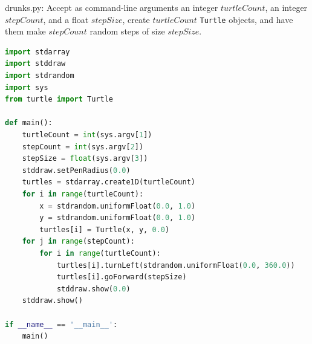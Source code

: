 \documentclass[8pt,a4paper,compress]{beamer}
\begin{document}
\begin{frame}[fragile]
\pause

\begin{framed}
\tiny drunks.py: Accept as command-line arguments an integer $turtleCount$, an integer $stepCount$, and a float $stepSize$, create $turtleCount$ \lstinline{Turtle} objects, and have them make $stepCount$ random steps of size $stepSize$.
\end{framed}

\begin{lstlisting}[language=python,style=focusin]
import stdarray
import stddraw
import stdrandom
import sys
from turtle import Turtle

def main():
    turtleCount = int(sys.argv[1])
    stepCount = int(sys.argv[2])
    stepSize = float(sys.argv[3])
    stddraw.setPenRadius(0.0)
    turtles = stdarray.create1D(turtleCount)
    for i in range(turtleCount):
        x = stdrandom.uniformFloat(0.0, 1.0)
        y = stdrandom.uniformFloat(0.0, 1.0)
        turtles[i] = Turtle(x, y, 0.0)
    for j in range(stepCount):
        for i in range(turtleCount):
            turtles[i].turnLeft(stdrandom.uniformFloat(0.0, 360.0))
            turtles[i].goForward(stepSize)
            stddraw.show(0.0)
    stddraw.show()
    
if __name__ == '__main__':
    main()
\end{lstlisting}
\end{frame}
\end{document}

